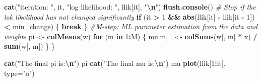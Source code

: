 \documentclass[
]{article}
\newenvironment{Shaded}{\begin{snugshade}}{\end{snugshade}}
\newcommand{\AttributeTok}[1]{\textcolor[rgb]{0.13,0.29,0.53}{#1}}
\newcommand{\CommentTok}[1]{\textcolor[rgb]{0.56,0.35,0.01}{\textit{#1}}}
\newcommand{\ControlFlowTok}[1]{\textcolor[rgb]{0.13,0.29,0.53}{\textbf{#1}}}
\newcommand{\DecValTok}[1]{\textcolor[rgb]{0.00,0.00,0.81}{#1}}
\newcommand{\FunctionTok}[1]{\textcolor[rgb]{0.13,0.29,0.53}{\textbf{#1}}}
\newcommand{\NormalTok}[1]{#1}
\newcommand{\OtherTok}[1]{\textcolor[rgb]{0.56,0.35,0.01}{#1}}
\newcommand{\SpecialCharTok}[1]{\textcolor[rgb]{0.81,0.36,0.00}{\textbf{#1}}}
\newcommand{\StringTok}[1]{\textcolor[rgb]{0.31,0.60,0.02}{#1}}
\begin{document}
\begin{Shaded}
\begin{Highlighting}[]
  \FunctionTok{cat}\NormalTok{(}\StringTok{"iteration: "}\NormalTok{, it, }\StringTok{"log likelihood: "}\NormalTok{, llik[it], }\StringTok{"}\SpecialCharTok{\textbackslash{}n}\StringTok{"}\NormalTok{)}
  \FunctionTok{flush.console}\NormalTok{()}
  \CommentTok{\# Stop if the lok likelihood has not changed significantly}
  \ControlFlowTok{if}\NormalTok{ (it }\SpecialCharTok{\textgreater{}} \DecValTok{1} \SpecialCharTok{\&\&} \FunctionTok{abs}\NormalTok{(llik[it] }\SpecialCharTok{{-}}\NormalTok{ llik[it }\SpecialCharTok{{-}} \DecValTok{1}\NormalTok{]) }\SpecialCharTok{\textless{}}\NormalTok{ min\_change) \{}
    \ControlFlowTok{break}
\NormalTok{  \}}
  \CommentTok{\#M{-}step: ML parameter estimation from the data and weights}
\NormalTok{  pi }\OtherTok{\textless{}{-}} \FunctionTok{colMeans}\NormalTok{(w)}
  \ControlFlowTok{for}\NormalTok{ (m }\ControlFlowTok{in} \DecValTok{1}\SpecialCharTok{:}\NormalTok{M) \{}
\NormalTok{    mu[m, ] }\OtherTok{\textless{}{-}} \FunctionTok{colSums}\NormalTok{(w[, m] }\SpecialCharTok{*}\NormalTok{ x) }\SpecialCharTok{/} \FunctionTok{sum}\NormalTok{(w[, m])}
\NormalTok{  \}}
\NormalTok{\}}

\FunctionTok{cat}\NormalTok{(}\StringTok{"The final pi is:}\SpecialCharTok{\textbackslash{}n}\StringTok{"}\NormalTok{)}
\NormalTok{pi}
\FunctionTok{cat}\NormalTok{(}\StringTok{"The final mu is:}\SpecialCharTok{\textbackslash{}n}\StringTok{"}\NormalTok{)}
\NormalTok{mu}
\FunctionTok{plot}\NormalTok{(llik[}\DecValTok{1}\SpecialCharTok{:}\NormalTok{it], }\AttributeTok{type=}\StringTok{"o"}\NormalTok{)}
\end{Highlighting}
\end{Shaded}
\end{document}
